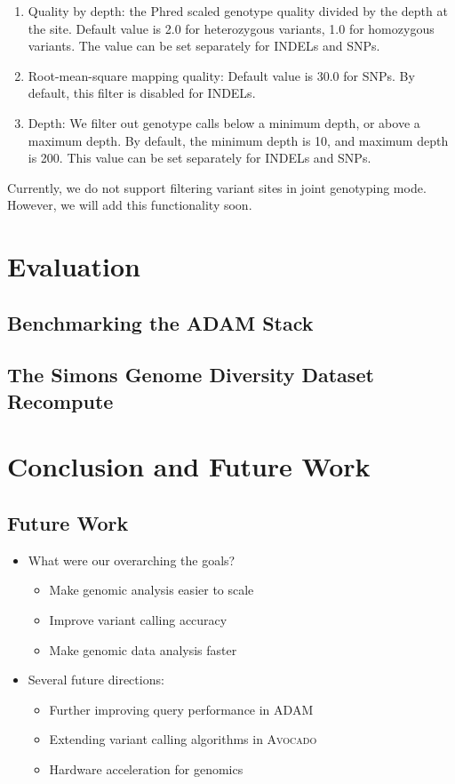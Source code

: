 \documentclass[phd]{ucbthesis}
\begin{document}
\begin{enumerate}
\item Quality by depth: the Phred scaled genotype quality divided by the depth at
the site. Default value is 2.0 for heterozygous variants, 1.0 for homozygous
variants. The value can be set separately for INDELs and SNPs.
\item Root-mean-square mapping quality: Default value is 30.0 for SNPs. By default,
this filter is disabled for INDELs.
\item Depth: We filter out genotype calls below a minimum depth, or above a maximum
depth. By default, the minimum depth is 10, and maximum depth is 200. This value
can be set separately for INDELs and SNPs.
\end{enumerate}

Currently, we do not support filtering variant sites in joint genotyping mode.
However, we will add this functionality soon.

\part{Evaluation}

\chapter{Benchmarking the \textsc{ADAM} Stack}
\label{chap:benchmarking}

\chapter{The Simons Genome Diversity Dataset Recompute}
\label{chap:sgdd}

\part{Conclusion and Future Work}

\chapter{Future Work}
\label{sec:future-work}

\begin{itemize}
\item What were our overarching the goals?
  \begin{itemize}
  \item Make genomic analysis easier to scale
  \item Improve variant calling accuracy
  \item Make genomic data analysis faster
  \end{itemize}
\item Several future directions:
  \begin{itemize}
  \item Further improving query performance in \textsc{ADAM}
  \item Extending variant calling algorithms in \textsc{Avocado}
  \item Hardware acceleration for genomics
  \end{itemize}
\end{itemize}
\end{document}
